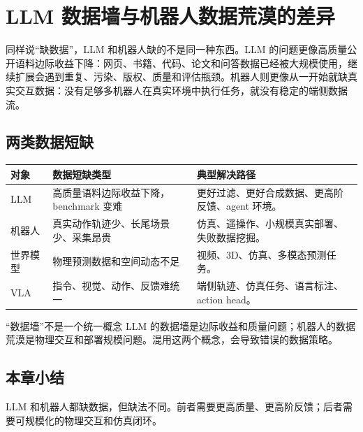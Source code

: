 \section{LLM 数据墙与机器人数据荒漠的差异}

同样说“缺数据”，LLM 和机器人缺的不是同一种东西。LLM 的问题更像高质量公开语料边际收益下降：网页、书籍、代码、论文和问答数据已经被大规模使用，继续扩展会遇到重复、污染、版权、质量和评估瓶颈。机器人则更像从一开始就缺真实交互数据：没有足够多机器人在真实环境中执行任务，就没有稳定的端侧数据流。

\subsection{两类数据短缺}

\noindent\begin{longtable}{p{}p{}p{}}
\toprule
对象 & 数据短缺类型 & 典型解决路径 \\
\midrule
LLM & 高质量语料边际收益下降，benchmark 变难 & 更好过滤、更好合成数据、更高阶反馈、agent 环境。 \\
机器人 & 真实动作轨迹少、长尾场景少、采集昂贵 & 仿真、遥操作、小规模真实部署、失败数据挖掘。 \\
世界模型 & 物理预测数据和空间动态不足 & 视频、3D、仿真、多模态预测任务。 \\
VLA & 指令、视觉、动作、反馈难统一 & 端侧轨迹、仿真任务、语言标注、action head。 \\
\bottomrule
\end{longtable}

\begin{importantbox}{“数据墙”不是一个统一概念}
LLM 的数据墙是边际收益和质量问题；机器人的数据荒漠是物理交互和部署规模问题。混用这两个概念，会导致错误的数据策略。
\end{importantbox}

\subsection{本章小结}

LLM 和机器人都缺数据，但缺法不同。前者需要更高质量、更高阶反馈；后者需要可规模化的物理交互和仿真闭环。


